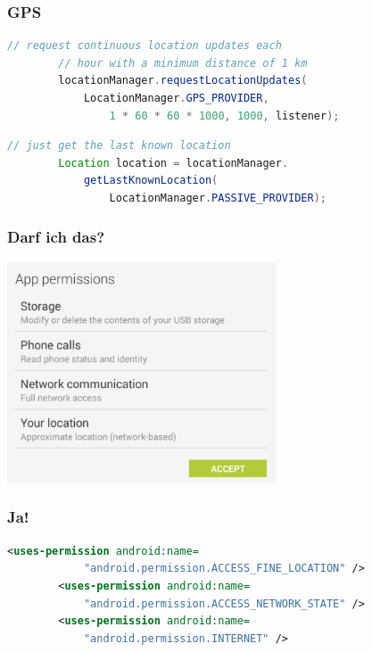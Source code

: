 \begin{frame}[c,fragile]
	\frametitle{GPS}
	\begin{lstlisting}[language=Java]
		// request continuous location updates each
		// hour with a minimum distance of 1 km 
		locationManager.requestLocationUpdates(
		    LocationManager.GPS_PROVIDER,
		        1 * 60 * 60 * 1000, 1000, listener);
    \end{lstlisting}
    \pause
	\begin{lstlisting}[language=Java]
		// just get the last known location
		Location location = locationManager.
		    getLastKnownLocation(
		        LocationManager.PASSIVE_PROVIDER);
    \end{lstlisting}    
\end{frame}

\begin{frame}[c]
	\frametitle{Darf ich das?}
	\pause
	\begin{center}
		\includegraphics[width=8cm]{pictures/permissions.png}
	\end{center}
\end{frame}

\begin{frame}[c,fragile]
	\frametitle{Ja!}
	\begin{lstlisting}[language=XML]
		<uses-permission android:name=
		    "android.permission.ACCESS_FINE_LOCATION" />
		<uses-permission android:name=
		    "android.permission.ACCESS_NETWORK_STATE" />
		<uses-permission android:name=
		    "android.permission.INTERNET" />
	\end{lstlisting}
\end{frame}





